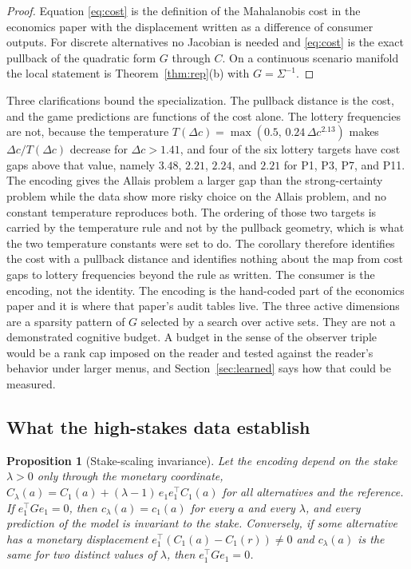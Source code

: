 \documentclass[11pt]{article}
\newtheorem{proposition}{Proposition}
\theoremstyle{definition}
\theoremstyle{remark}
\begin{document}
\begin{proof}
Equation \eqref{eq:cost} is the definition of the Mahalanobis cost in the economics paper with the displacement written as a difference of consumer outputs.
For discrete alternatives no Jacobian is needed and \eqref{eq:cost} is the exact pullback of the quadratic form $G$ through $C$.
On a continuous scenario manifold the local statement is Theorem~\ref{thm:rep}(b) with $G=\Sigma^{-1}$.
\end{proof}

Three clarifications bound the specialization.
The pullback distance is the cost, and the game predictions are functions of the cost alone.
The lottery frequencies are not, because the temperature $T(\Delta c)=\max(0.5,\,0.24\,\Delta c^{2.13})$ makes $\Delta c/T(\Delta c)$ decrease for $\Delta c>1.41$, and four of the six lottery targets have cost gaps above that value, namely $3.48$, $2.21$, $2.24$, and $2.21$ for P1, P3, P7, and P11.
The encoding gives the Allais problem a larger gap than the strong-certainty problem while the data show more risky choice on the Allais problem, and no constant temperature reproduces both.
The ordering of those two targets is carried by the temperature rule and not by the pullback geometry, which is what the two temperature constants were set to do.
The corollary therefore identifies the cost with a pullback distance and identifies nothing about the map from cost gaps to lottery frequencies beyond the rule as written.
The consumer is the encoding, not the identity.
The encoding is the hand-coded part of the economics paper and it is where that paper's audit tables live.
The three active dimensions are a sparsity pattern of $G$ selected by a search over active sets.
They are not a demonstrated cognitive budget.
A budget in the sense of the observer triple would be a rank cap imposed on the reader and tested against the reader's behavior under larger menus, and Section~\ref{sec:learned} says how that could be measured.

\subsection{What the high-stakes data establish}

\begin{proposition}[Stake-scaling invariance]
\label{prop:stake}
Let the encoding depend on the stake $\lambda>0$ only through the monetary coordinate, $C_{\lambda}(a)=C_{1}(a)+(\lambda-1)\,e_{1}e_{1}^{\top}C_{1}(a)$ for all alternatives and the reference. If $e_{1}^{\top}Ge_{1}=0$, then $c_{\lambda}(a)=c_{1}(a)$ for every $a$ and every $\lambda$, and every prediction of the model is invariant to the stake. Conversely, if some alternative has a monetary displacement $e_{1}^{\top}(C_{1}(a)-C_{1}(r))\ne0$ and $c_{\lambda}(a)$ is the same for two distinct values of $\lambda$, then $e_{1}^{\top}Ge_{1}=0$.
\end{proposition}
\end{document}
